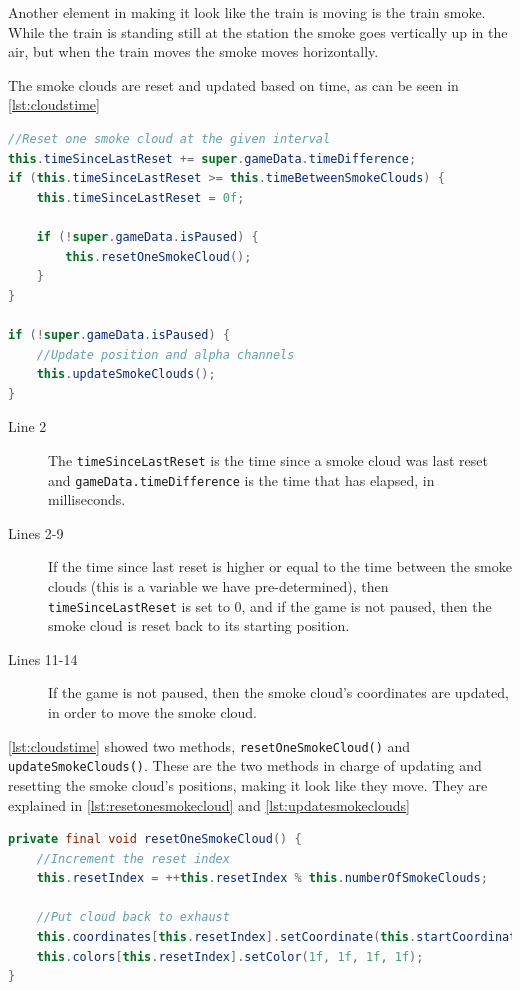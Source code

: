 Another element in making it look like the train is moving is the train smoke. While the train is standing still at the station the smoke goes vertically up in the air, but when the train moves the smoke moves horizontally. 

The smoke clouds are reset and updated based on time, as can be seen in \autoref{lst:cloudstime}

\begin{lstlisting}[language=java,firstnumber=1,caption={Smoke clouds getting reset based on time intervals.},label=lst:cloudstime]
//Reset one smoke cloud at the given interval
this.timeSinceLastReset += super.gameData.timeDifference;
if (this.timeSinceLastReset >= this.timeBetweenSmokeClouds) {
    this.timeSinceLastReset = 0f;
    
    if (!super.gameData.isPaused) {
        this.resetOneSmokeCloud();
    }
}

if (!super.gameData.isPaused) {
    //Update position and alpha channels
    this.updateSmokeClouds();
}
\end{lstlisting}

\begin{description}
\item[Line 2] The \lstinline|timeSinceLastReset| is the time since a smoke cloud was last reset and \lstinline|gameData.timeDifference| is the time that has elapsed, in milliseconds. 
\item[Lines 2-9] If the time since last reset is higher or equal to the time between the smoke clouds (this is a variable we have pre-determined), then \lstinline|timeSinceLastReset| is set to 0, and if the game is not paused, then the smoke cloud is reset back to its starting position. 
\item[Lines 11-14] If the game is not paused, then the smoke cloud's coordinates are updated, in order to move the smoke cloud. 
\end{description}

\autoref{lst:cloudstime} showed two methods, \lstinline|resetOneSmokeCloud()| and \lstinline|updateSmokeClouds()|. These are the two methods in charge of updating and resetting the smoke cloud's positions, making it look like they move. They are explained in \autoref{lst:resetonesmokecloud} and \autoref{lst:updatesmokeclouds}

\begin{lstlisting}[language=java,firstnumber=1,caption={Function handling the resetting of a smoke cloud.},label=lst:resetonesmokecloud]
private final void resetOneSmokeCloud() {
    //Increment the reset index
    this.resetIndex = ++this.resetIndex % this.numberOfSmokeClouds;
    
    //Put cloud back to exhaust
    this.coordinates[this.resetIndex].setCoordinate(this.startCoordinate.getX(), this.startCoordinate.getY());
    this.colors[this.resetIndex].setColor(1f, 1f, 1f, 1f);
}
\end{lstlisting}

